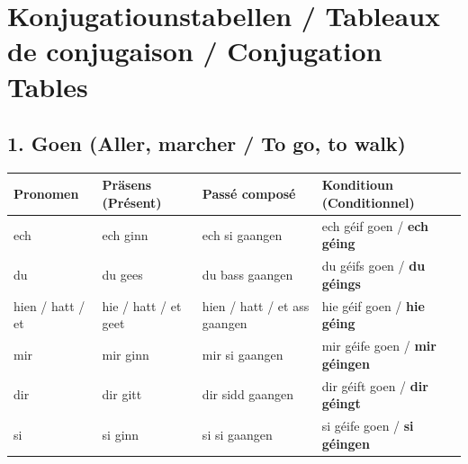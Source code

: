 \vspace{1.5em}

\section[Konjugatiounstabellen / Conjugation Tables]{Konjugatiounstabellen / Tableaux de conjugaison / Conjugation Tables}

\subsection*{1. Goen (Aller, marcher / To go, to walk)}
\begin{center}
\small
\setlength{\tabcolsep}{3.5pt}
\begin{tabular}{llll}
\toprule
\textbf{Pronomen} & \textbf{Präsens (Présent)} & \textbf{Passé composé} & \textbf{Konditioun (Conditionnel)} \\
\midrule
ech & ech ginn & ech si gaangen & ech géif goen / \textbf{ech géing} \\
du & du gees & du bass gaangen & du géifs goen / \textbf{du géings} \\
hien / hatt / et & hie / hatt / et geet & hien / hatt / et ass gaangen & hie géif goen / \textbf{hie géing} \\
mir & mir ginn & mir si gaangen & mir géife goen / \textbf{mir géingen} \\
dir & dir gitt & dir sidd gaangen & dir géift goen / \textbf{dir géingt} \\
si & si ginn & si si gaangen & si géife goen / \textbf{si géingen} \\
\bottomrule
\end{tabular}
\end{center}

\vspace{0.4em}

